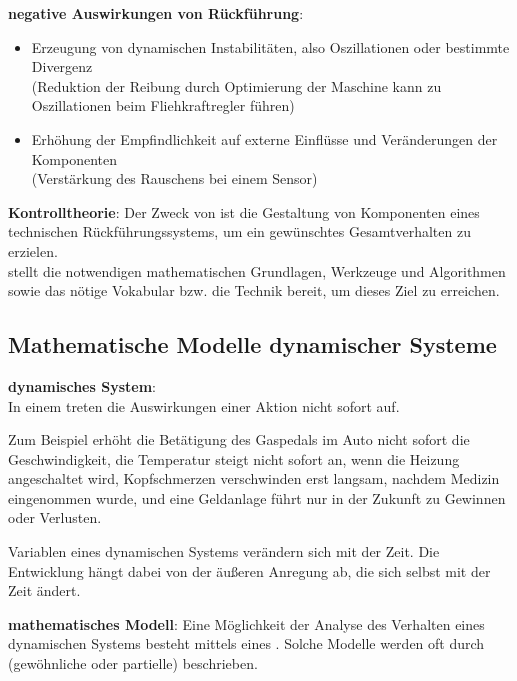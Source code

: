 \textbf{negative Auswirkungen von Rückführung}:
\begin{itemize}
    \item
    Erzeugung von dynamischen Instabilitäten, also Oszillationen oder bestimmte Divergenz\\
    (Reduktion der Reibung durch Optimierung der Maschine kann zu Oszillationen beim
    Fliehkraftregler führen)

    \item
    Erhöhung der Empfindlichkeit auf externe Einflüsse und Veränderungen der Komponenten\\
    (Verstärkung des Rauschens bei einem Sensor)
\end{itemize}

\linie

\textbf{Kontrolltheorie}:
Der Zweck von  ist die Gestaltung von Komponenten eines
technischen Rückführungssystems, um ein gewünschtes Gesamtverhalten zu erzielen.\\
 stellt die notwendigen mathematischen Grundlagen,
Werkzeuge und Algorithmen sowie das nötige Vokabular bzw. die Technik bereit, um dieses Ziel zu
erreichen.

\pagebreak

\subsection{%
    Mathematische Modelle dynamischer Systeme%
}

\textbf{dynamisches System}:\\
In einem  treten die Auswirkungen einer Aktion nicht sofort auf.

Zum Beispiel erhöht die Betätigung des Gaspedals im Auto nicht sofort die Geschwindigkeit,
die Temperatur steigt nicht sofort an, wenn die Heizung angeschaltet wird,
Kopfschmerzen verschwinden erst langsam, nachdem Medizin eingenommen wurde, und
eine Geldanlage führt nur in der Zukunft zu Gewinnen oder Verlusten.

Variablen eines dynamischen Systems verändern sich mit der Zeit.
Die Entwicklung hängt dabei von der äußeren Anregung ab, die sich selbst mit der Zeit ändert.

\linie

\textbf{mathematisches Modell}:
Eine Möglichkeit der Analyse des Verhalten eines dynamischen Systems besteht mittels eines
.
Solche Modelle werden oft durch (gewöhnliche oder partielle)
 beschrieben.

